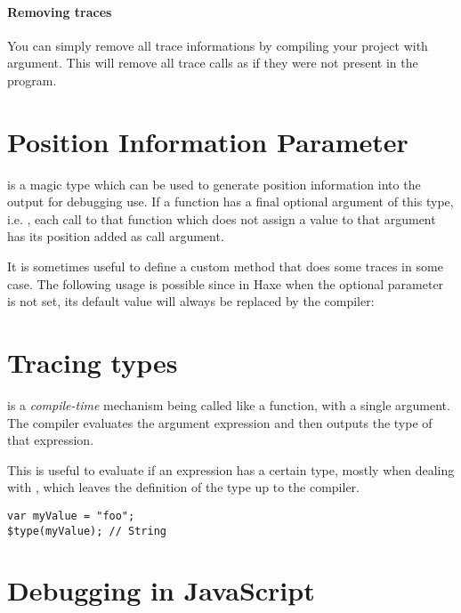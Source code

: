 \paragraph{Removing traces}

You can simply remove all trace informations by compiling your project with  argument. This will remove all trace calls as if they were not present in the program.

\section{Position Information Parameter}
\label{debugging-posinfos}

\href{http://api.haxe.org/haxe/PosInfos.html}{} is a magic type which can be used to generate position information into the output for debugging use.
If a function has a final optional argument of this type, i.e. , each call to that function which does not assign a value to that argument has its position added as call argument. 

It is sometimes useful to define a custom method that does some traces in some case. The following usage is possible since in Haxe when the  optional parameter is not set, its default value will always be replaced by the compiler:


\section{Tracing types}
\label{debugging-type-function}

 is a \emph{compile-time} mechanism being called like a function, with a single argument. The compiler evaluates the argument expression and then outputs the type of that expression.

This is useful to evaluate if an expression has a certain type, mostly when dealing with , which leaves the definition of the type up to the compiler.

\begin{lstlisting}
var myValue = "foo";
$type(myValue); // String
\end{lstlisting}


\section{Debugging in JavaScript}
\label{debugging-javascript}


